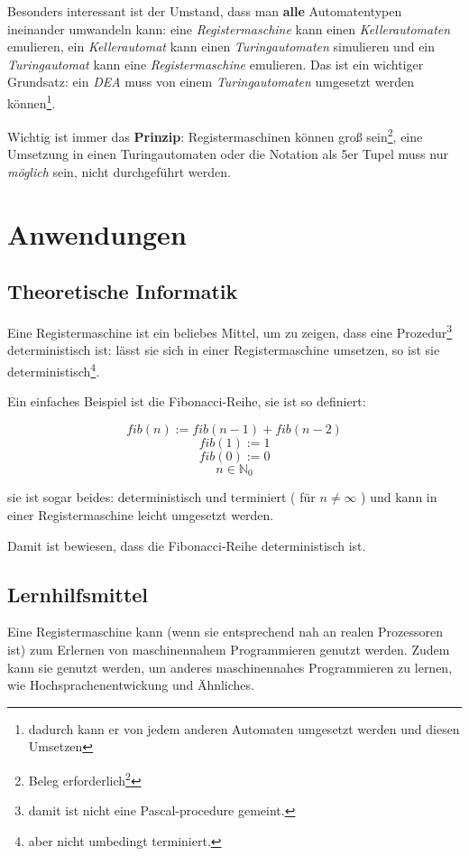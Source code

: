 \documentclass[a4paper,12pt,oneside]{scrreprt}
\begin{document}
Besonders interessant ist der Umstand, dass man \textbf{alle} Automatentypen ineinander umwandeln kann: eine \textit{Registermaschine} kann einen \textit{Kellerautomaten} emulieren, ein \textit{Kellerautomat} kann einen \textit{Turingautomaten} simulieren und ein \textit{Turingautomat} kann eine \textit{Registermaschine} emulieren. Das ist ein wichtiger Grundsatz: ein \textit{DEA} muss von einem \textit{Turingautomaten} umgesetzt werden können\footnote{dadurch kann er von jedem anderen Automaten umgesetzt werden und diesen Umsetzen}.

Wichtig ist immer das \textbf{Prinzip}: Registermaschinen können groß sein\footnote{Beleg erforderlich\footnote{... kann man mit Py Register Machine wohl leicht nachweisen.}}, eine Umsetzung in einen Turingautomaten oder die Notation als 5er Tupel muss nur \textit{möglich} sein, nicht durchgeführt werden.

\chapter{Anwendungen}

\section{Theoretische Informatik}

Eine Registermaschine ist ein beliebes Mittel, um zu zeigen, dass eine Prozedur\footnote{damit ist nicht eine Pascal-procedure gemeint.} deterministisch ist: lässt sie sich in einer Registermaschine umsetzen, so ist sie deterministisch\footnote{aber nicht umbedingt terminiert.}.

Ein einfaches Beispiel ist die Fibonacci-Reihe, sie ist so definiert:

$$ fib(n) := fib(n-1) + fib(n-2)$$
$$ fib(1) := 1 $$
$$ fib(0) := 0 $$
$$ n \in \mathbb{N}_0 $$

sie ist sogar beides: deterministisch und terminiert ( für $ n \neq \infty $ ) und kann in einer Registermaschine leicht umgesetzt werden.

Damit ist bewiesen, dass die Fibonacci-Reihe deterministisch ist.

\section{Lernhilfsmittel}

Eine Registermaschine kann (wenn sie entsprechend nah an realen Prozessoren ist) zum Erlernen von maschinennahem Programmieren genutzt werden.
Zudem kann sie genutzt werden, um anderes maschinennahes Programmieren zu lernen, wie Hochsprachenentwickung und Ähnliches.
\end{document}

